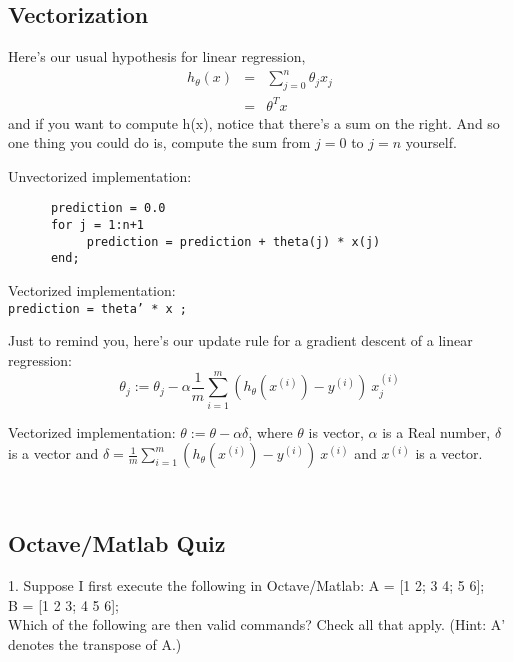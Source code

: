 \documentclass[11pt,a4paper]{article}
\begin{document}
    \subsection{Vectorization}

    Here's our usual hypothesis for linear regression, 
    \begin{eqnarray}
      h_{\theta}(x) & = & \sum_{j=0}^{n} \theta_{j} x_{j} \\
                           & = & \theta^{T} x
    \end{eqnarray}
    and if you want to compute h(x), notice that there's a sum on the
    right. And so one thing you could do is, compute the sum from $j = 0$ to
    $j = n$ yourself. 
    
    Unvectorized implementation:
    \begin{lstlisting}
      prediction = 0.0 
      for j = 1:n+1
           prediction = prediction + theta(j) * x(j)
      end; 
    \end{lstlisting}

    Vectorized implementation:\\
    {\tt prediction = theta' * x ; }

    
    Just to remind you, here's our update rule for a gradient descent
    of a linear regression:
    \begin{equation}
      \theta_{j} :=   \theta_{j} - \alpha \frac{1}{m}\sum_{i=1}^{m} (h_{\theta} (x^{(i)}) - y^{(i)}) \   x^{(i)}_{j}
    \end{equation}
    
    Vectorized implementation:
    $\theta :=  \theta - \alpha \delta$, 
    where $\theta$ is vector, $\alpha$ is a Real number, 
    $\delta$ is a vector and $\delta = \frac{1}{m}\sum_{i=1}^{m} (h_{\theta} (x^{(i)}) - y^{(i)}) \   x^{(i)}$ and $x^{(i)}$ is a vector.
    \begin{lstlisting}
     
    \end{lstlisting}


\subsection{Octave/Matlab Quiz}
1. Suppose I first execute the following in Octave/Matlab:
A = [1 2; 3 4; 5 6];\\
B = [1 2 3; 4 5 6];\\
Which of the following are then valid commands? Check all that apply. (Hint: A' denotes the transpose of A.)
\end{document}
